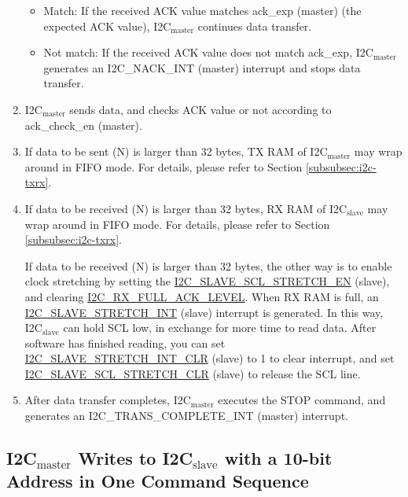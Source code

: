 \documentclass[main\_\_EN.tex]{subfiles}
\begin{document}
\begin{enumerate}
\begin{itemize}
\item Match: If the received ACK value matches ack\_exp (master) (the expected ACK value), I2C$_\text{master}$ continues data transfer.
\item Not match: If the received ACK value does not match ack\_exp, I2C$_\text{master}$ generates an I2C\_NACK\_INT (master) interrupt and stops data transfer.
\end{itemize}

\item I2C$_\text{master}$ sends data, and checks ACK value or not according to ack\_check\_en (master).
\item If data to be sent (N) is larger than 32 bytes, TX RAM of I2C$_\text{master}$ may wrap around in FIFO mode. For details, please refer to Section \ref{subsubsec:i2c-txrx}.
\item If data to be received (N) is larger than 32 bytes, RX RAM of I2C$_\text{slave}$ may wrap around in FIFO mode. For details, please refer to Section \ref{subsubsec:i2c-txrx}.

If data to be received (N) is larger than 32 bytes, the other way is to enable clock stretching by setting the \hyperref[fielddesc:I2CSLAVESCLSTRETCHEN]{I2C\_SLAVE\_SCL\_STRETCH\_EN} (slave), and clearing \hyperref[fielddesc:I2CRXFULLACKLEVEL]{I2C\_RX\_FULL\_ACK\_LEVEL}. When RX RAM is full, an \hyperref[int:i2c-slave-stretch]{I2C\_SLAVE\_STRETCH\_INT} (slave) interrupt is generated. In this way, I2C$_\text{slave}$ can hold SCL low, in exchange for more time to read data. After software has finished reading, you can set \hyperref[fielddesc:I2CSLAVESTRETCHINTCLR]{I2C\_SLAVE\_STRETCH\_INT\_CLR} (slave) to 1 to clear interrupt, and set \hyperref[fielddesc:I2CSLAVESCLSTRETCHCLR]{I2C\_SLAVE\_SCL\_STRETCH\_CLR} (slave) to release the SCL line.

\item After data transfer completes, I2C$_\text{master}$ executes the STOP command, and generates an I2C\_TRANS\_COMPLETE\_INT (master) interrupt.

\end{enumerate}

\subsection{\texorpdfstring{I2C$_\text{master}$ Writes to I2C$_\text{slave}$ with a 10-bit Address in One Command Sequence}{I2C master Writes to I2C slave with a 10-bit Address in One Command Sequence}}\label{sub:i2c-app-mws10}
\end{document}
